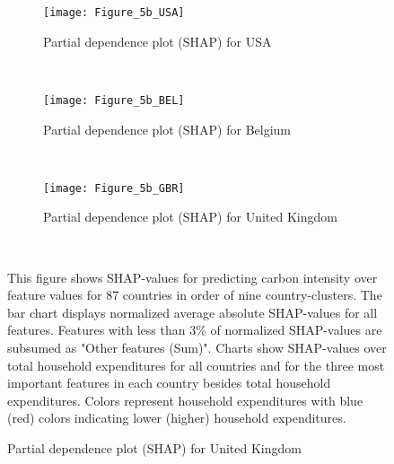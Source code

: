 \begin{figure}[ht!]\ContinuedFloat
    \centering
   \begin{subfigure}[b]{\textwidth}
         \centering
         \caption{Partial dependence plot (SHAP) for USA}
         \label{fig:5b_USA}
         \texttt{[image: Figure\_5b\_USA]}         
     \end{subfigure}
    \\
    \vspace{0.5cm}
   \begin{subfigure}[b]{\textwidth}
         \centering
         \caption{Partial dependence plot (SHAP) for Belgium}
         \label{fig:5b_BEL}
         \texttt{[image: Figure\_5b\_BEL]}         
     \end{subfigure}
    \\
    \vspace{0.5cm}
   \begin{subfigure}[b]{\textwidth}
         \centering
         \caption{Partial dependence plot (SHAP) for United Kingdom}
         \label{fig:5b_GBR}
         \texttt{[image: Figure\_5b\_GBR]}
    \end{subfigure}
    \\
    \vspace{0.5cm}
    \begin{subcaption2}
     This figure shows SHAP-values for predicting carbon intensity over feature values for 87 countries in order of nine country-clusters. The bar chart displays normalized average absolute SHAP-values for all features. Features with less than 3\% of normalized SHAP-values are subsumed as "Other features (Sum)". Charts show SHAP-values over total household expenditures for all countries and for the three most important features in each country besides total household expenditures. Colors represent household expenditures with blue (red) colors indicating lower (higher) household expenditures.
     \end{subcaption2}
\end{figure}

